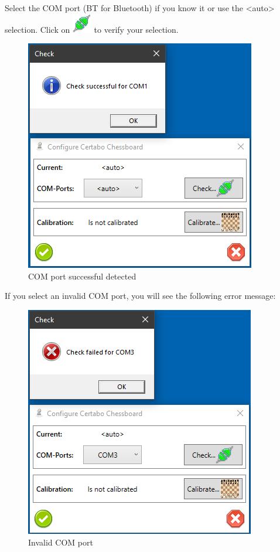 \documentclass[11pt,a4paper]{article}
\begin{document}
Select the COM port (BT for Bluetooth) if you know it or use the <auto> selection. 
Click on \includegraphics[scale=0.5]{connect.png} to verify your selection.

\begin{figure}[H]
	\centering
	\includegraphics[scale=0.9]{Calibrate1.png}
	\caption{COM port successful detected}
	\label{fig:Calibrate1}
\end{figure}

If you select an invalid COM port, you will see the following error message:

\begin{figure}[H]
	\centering
	\includegraphics[scale=0.9]{Calibrate2.png}
	\caption{Invalid COM port }
	\label{fig:Calibrate2}
\end{figure}
\end{document}
